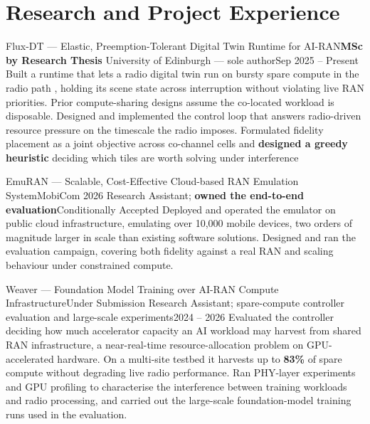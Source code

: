 \section{Research and Project Experience}
  \resumeSubHeadingListStart

    \resumeSubheading
      {Flux-DT --- Elastic, Preemption-Tolerant Digital Twin Runtime for AI-RAN}{\textbf{MSc by Research Thesis}}
      {University of Edinburgh --- sole author}{Sep 2025 -- Present}
      \resumeItemListStart
          {Built a runtime that lets a radio digital twin run on bursty spare compute in the radio path , holding its scene state across interruption without violating live RAN priorities. Prior compute-sharing designs assume the co-located workload is disposable.}
          {Designed and implemented the control loop that answers radio-driven resource pressure on the timescale the radio imposes.}
          {Formulated fidelity placement as a joint objective across co-channel cells and \textbf{designed a greedy heuristic} deciding which tiles are worth solving under interference}
      \resumeItemListEnd

    \resumeSubheading
      {EmuRAN --- Scalable, Cost-Effective Cloud-based RAN Emulation System}{MobiCom 2026}
      {Research Assistant; \textbf{owned the end-to-end evaluation}}{Conditionally Accepted}
      \resumeItemListStart
          {Deployed and operated the emulator on public cloud infrastructure, emulating over 10,000 mobile devices, two orders of magnitude larger in scale than existing software solutions.}
          {Designed and ran the evaluation campaign, covering both fidelity against a real RAN and scaling behaviour under constrained compute.}
      \resumeItemListEnd

    \resumeSubheading
      {Weaver --- Foundation Model Training over AI-RAN Compute Infrastructure}{Under Submission}
      {Research Assistant; spare-compute controller evaluation and large-scale experiments}{2024 -- 2026}
      \resumeItemListStart
          {Evaluated the controller deciding how much accelerator capacity an AI workload may harvest from shared RAN infrastructure, a near-real-time resource-allocation problem on GPU-accelerated hardware. On a multi-site testbed it harvests up to \textbf{83\%} of spare compute without degrading live radio performance.}
          {Ran PHY-layer experiments and GPU profiling to characterise the interference between training workloads and radio processing, and carried out the large-scale foundation-model training runs used in the evaluation.}
      \resumeItemListEnd

